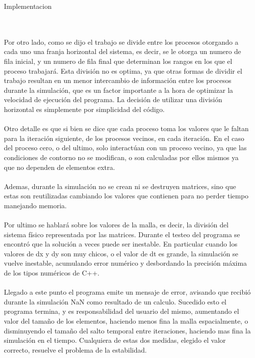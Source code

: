 \begin{section}{Implementacion}
\begin{itemize}
~\\
~\\
Por otro lado, como se dijo el trabajo se divide entre los procesos otorgando a cada uno una franja horizontal del sistema, es decir, se le otorga un numero de fila inicial, y un numero de fila final que determinan los rangos en los que el proceso trabajará. Esta división no es optima, ya que otras formas de dividir el trabajo resultan en un menor intercambio de información entre los procesos durante la simulación, que es un factor importante a la hora de optimizar la velocidad de ejecución del programa. La decisión de utilizar una división horizontal es simplemente por simplicidad del código.
~\\
~\\
Otro detalle es que si bien se dice que cada proceso toma los valores que le faltan para la iteración siguiente, de los procesos vecinos, en cada iteración. En el caso del proceso cero, o del ultimo, solo interactúan con un proceso vecino, ya que las condiciones de contorno no se modifican, o son calculadas por ellos mismos ya que no dependen de elementos extra.
~\\
~\\ Ademas, durante la simulación no se crean ni se destruyen matrices, sino que estas son reutilizadas cambiando los valores que contienen para no perder tiempo manejando memoria.
~\\
~\\
Por ultimo se hablará sobre los valores de la malla, es decir, la división del sistema físico representada por las matrices. Durante el testeo del programa se encontró que la solución a veces puede ser inestable. En particular cuando los valores de dx y dy son muy chicos, o el valor de dt es grande, la simulación se vuelve inestable, acumulando error numérico y desbordando la precisión máxima de los tipos numéricos de C++. 
~\\
~\\
Llegado a este punto el programa emite un mensaje de error, avisando que recibió durante la simulación NaN como resultado de un calculo. Sucedido esto el programa termina, y es responsabilidad del usuario del mismo, aumentando el valor del tamaño de los elementos, haciendo menos fina la malla espacialmente, o disminuyendo el tamaño del salto temporal entre iteraciones, haciendo mas fina la simulación en el tiempo. Cualquiera de estas dos medidas, elegido el valor correcto, resuelve el problema de la estabilidad. 
~\\
~\\

\end{itemize}
\end{section}
